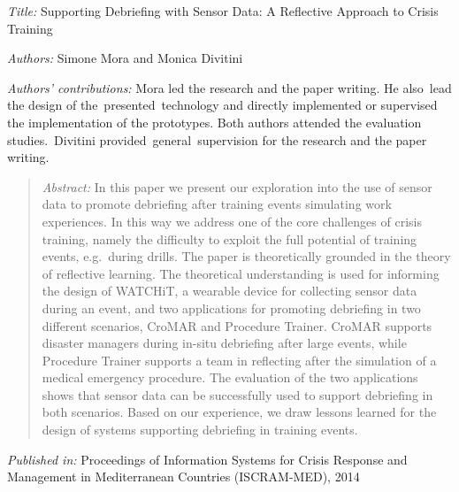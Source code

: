 \emph{Title:} Supporting Debriefing with Sensor Data: A Reflective
Approach to Crisis Training

\emph{Authors:} Simone Mora and Monica Divitini

\emph{Authors' contributions:} Mora led the research and the paper
writing. He also~lead the design of the~presented~technology and
directly implemented or supervised the implementation of the prototypes.
Both authors attended the evaluation studies.~Divitini
provided~general~supervision for the research and the paper writing.

\begin{quote}
\emph{Abstract:} In this paper we present our exploration into the use
of sensor data to promote debriefing after training events simulating
work experiences. In this way we address one of the core challenges of
crisis training, namely the difficulty to exploit the full potential of
training events, e.g.~during drills. The paper is theoretically grounded
in the theory of reflective learning. The theoretical understanding is
used for informing the design of WATCHiT, a wearable device for
collecting sensor data during an event, and two applications for
promoting debriefing in two different scenarios, CroMAR and Procedure
Trainer. CroMAR supports disaster managers during in-situ debriefing
after large events, while Procedure Trainer supports a team in
reflecting after the simulation of a medical emergency procedure. The
evaluation of the two applications shows that sensor data can be
successfully used to support debriefing in both scenarios. Based on our
experience, we draw lessons learned for the design of systems supporting
debriefing in training events.
\end{quote}

\emph{Published in:} Proceedings of Information Systems for Crisis
Response and Management in Mediterranean Countries (ISCRAM-MED), 2014

